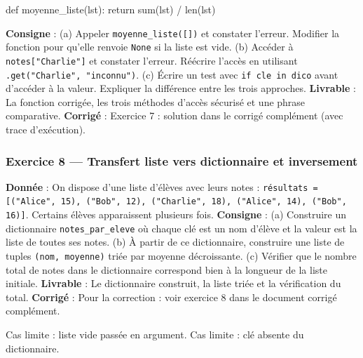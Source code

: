\begin{python}
def moyenne_liste(lst):
    return sum(lst) / len(lst)
\end{python}

\textbf{Consigne} : (a) Appeler \texttt{moyenne\_liste({[}{]})} et
constater l'erreur. Modifier la fonction pour qu'elle renvoie
\texttt{None} si la liste est vide. (b) Accéder à
\texttt{notes{[}"Charlie"{]}} et constater l'erreur. Réécrire l'accès en
utilisant \texttt{.get("Charlie",\ "inconnu")}. (c) Écrire un test avec
\texttt{if\ cle\ in\ dico} avant d'accéder à la valeur. Expliquer la
différence entre les trois approches. \textbf{Livrable} : La fonction
corrigée, les trois méthodes d'accès sécurisé et une phrase comparative.
\textbf{Corrigé} : Exercice 7 : solution dans le corrigé complément
(avec trace d'exécution).

\subsubsection{Exercice 8 — Transfert liste vers dictionnaire et inversement}

\textbf{Donnée} : On dispose d'une liste d'élèves avec leurs notes :
\lstinline|résultats = [("Alice", 15), ("Bob", 12), ("Charlie", 18), ("Alice", 14), ("Bob", 16)]|.
Certains élèves apparaissent plusieurs fois. \textbf{Consigne} : (a)
Construire un dictionnaire \texttt{notes\_par\_eleve} où chaque clé est
un nom d'élève et la valeur est la liste de toutes ses notes. (b) À
partir de ce dictionnaire, construire une liste de tuples
\texttt{(nom,\ moyenne)} triée par moyenne décroissante. (c) Vérifier
que le nombre total de notes dans le dictionnaire correspond bien à la
longueur de la liste initiale. \textbf{Livrable} : Le dictionnaire
construit, la liste triée et la vérification du total. \textbf{Corrigé}
: Pour la correction : voir exercice 8 dans le document corrigé
complément.

Cas limite : liste vide passée en argument. Cas limite : clé absente du
dictionnaire.
